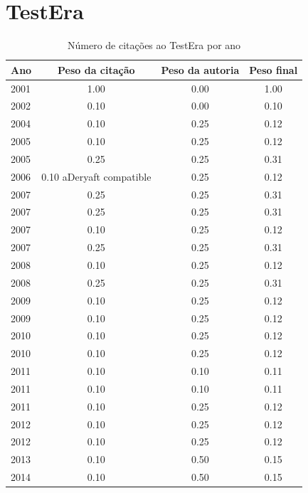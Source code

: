 \section{TestEra}
\begin{table}[H]
\caption{Número de citações ao TestEra por ano}
\centering
\begin{tabular}{| l | c | c | c |}
  \hline
  Ano & Peso da citação & Peso da autoria & Peso final \\
  \hline
  2001
    & 1.00
    & 0.00
    & {\color{blue} 1.00} \\
\hline
  2002
    & 0.10
    & 0.00
    & {\color{red} 0.10} \\
\hline
  2004
    & 0.10
    & 0.25
    & {\color{red} 0.12} \\
\hline
  2005
    & 0.10
    & 0.25
    & {\color{red} 0.12} \\
  2005
    & 0.25
    & 0.25
    & {\color{red} 0.31} \\
\hline
  2006
    & 0.10
          {\tiny aDeryaft compatible}
    & 0.25
    & {\color{red} 0.12} \\
\hline
  2007
    & 0.25
    & 0.25
    & {\color{red} 0.31} \\
  2007
    & 0.25
    & 0.25
    & {\color{red} 0.31} \\
  2007
    & 0.10
    & 0.25
    & {\color{red} 0.12} \\
  2007
    & 0.25
    & 0.25
    & {\color{red} 0.31} \\
\hline
  2008
    & 0.10
    & 0.25
    & {\color{red} 0.12} \\
  2008
    & 0.25
    & 0.25
    & {\color{red} 0.31} \\
\hline
  2009
    & 0.10
    & 0.25
    & {\color{red} 0.12} \\
  2009
    & 0.10
    & 0.25
    & {\color{red} 0.12} \\
\hline
  2010
    & 0.10
    & 0.25
    & {\color{red} 0.12} \\
  2010
    & 0.10
    & 0.25
    & {\color{red} 0.12} \\
\hline
  2011
    & 0.10
    & 0.10
    & {\color{red} 0.11} \\
  2011
    & 0.10
    & 0.10
    & {\color{red} 0.11} \\
  2011
    & 0.10
    & 0.25
    & {\color{red} 0.12} \\
\hline
  2012
    & 0.10
    & 0.25
    & {\color{red} 0.12} \\
  2012
    & 0.10
    & 0.25
    & {\color{red} 0.12} \\
\hline
  2013
    & 0.10
    & 0.50
    & {\color{red} 0.15} \\
\hline
  2014
    & 0.10
    & 0.50
    & {\color{red} 0.15} \\
\hline
\end{tabular}
\end{table}
